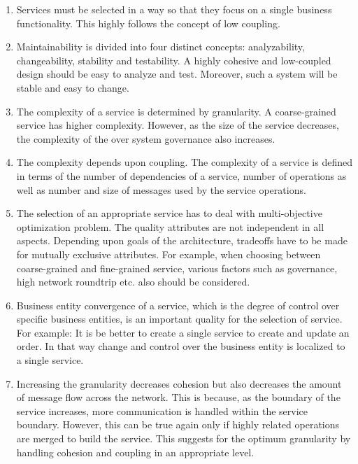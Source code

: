 {{{{{{{{{\begin{enumerate}
\item Services must be selected in a way so that they focus on a single business functionality. This highly follows the concept of low coupling. \cite{Perepletchikov:2007aa}\cite{Sindhgatta:2015aa}

\item Maintainability is divided into four distinct concepts:  analyzability, changeability, stability and testability.\cite{np:2001aa} A highly cohesive and low-coupled design should be easy to analyze and test. Moreover,  such a system will be stable and easy to change.\cite{Perepletchikov:2007aa}


\item The complexity of a service is determined by granularity. A coarse-grained service has higher complexity. However, as the size of the service decreases, the complexity of the over system governance also increases.
\cite{Saad-Alahmari:2011aa}

\item The complexity depends upon coupling. The complexity of a service is defined in terms of the number of dependencies of a service, number of operations as well as number and size of messages used by the service operations.\cite{Saad-Alahmari:2011aa}\cite{Sindhgatta:2015aa}\cite{Lee:2001aa}

\item The selection of an appropriate service has to deal with multi-objective optimization problem.  The quality attributes are not independent in all aspects. Depending upon goals of the architecture, tradeoffs have to be made for mutually exclusive attributes. For example, when choosing between coarse-grained and fine-grained service, various factors such as governance, high network roundtrip etc. also should be considered. 
\cite{Jamshidi:2008aa}

\item Business entity convergence of a service, which is the degree of control over specific business entities, is an important quality for the selection of service. For example: It is be better to create a single service to create and update an order. In that way change and control over the business entity is localized to a single service.\cite{Ma:2009aa}

\item Increasing the granularity decreases cohesion but also decreases the amount of message flow across the network. This is because, as the boundary of the service increases, more communication is handled within the service boundary. However, this can be true again only if highly related operations are merged to build the service. This suggests for the optimum granularity by handling cohesion and coupling in an appropriate level.\cite{Ma:2009aa}\cite{Bianco:2007aa}


\end{enumerate}}}}}}}}}}
